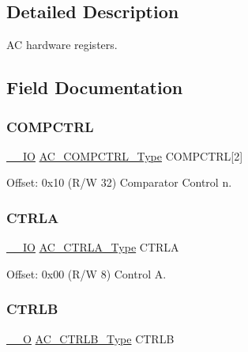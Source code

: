 \subsection{Detailed Description}
AC hardware registers. 

\subsection{Field Documentation}
\mbox{\label{struct_ac_a03a1ac0b5cd22c33531cdb31674b7eb2}} 
\subsubsection{\texorpdfstring{COMPCTRL}{COMPCTRL}}
{\footnotesize\ttfamily \mbox{\hyperlink{core__cm0plus_8h_aec43007d9998a0a0e01faede4133d6be}{\+\_\+\+\_\+\+IO}} \mbox{\hyperlink{union_a_c___c_o_m_p_c_t_r_l___type}{A\+C\+\_\+\+C\+O\+M\+P\+C\+T\+R\+L\+\_\+\+Type}} C\+O\+M\+P\+C\+T\+RL\mbox{[}2\mbox{]}}



Offset\+: 0x10 (R/W 32) Comparator Control n. 

\mbox{\label{struct_ac_a3209b7b8f542b802bd759d39be69aed8}} 
\subsubsection{\texorpdfstring{CTRLA}{CTRLA}}
{\footnotesize\ttfamily \mbox{\hyperlink{core__cm0plus_8h_aec43007d9998a0a0e01faede4133d6be}{\+\_\+\+\_\+\+IO}} \mbox{\hyperlink{union_a_c___c_t_r_l_a___type}{A\+C\+\_\+\+C\+T\+R\+L\+A\+\_\+\+Type}} C\+T\+R\+LA}



Offset\+: 0x00 (R/W 8) Control A. 

\mbox{\label{struct_ac_a05e0ac5f8548b79a95ad9a3f2bbc5641}} 
\subsubsection{\texorpdfstring{CTRLB}{CTRLB}}
{\footnotesize\ttfamily \mbox{\hyperlink{core__cm0plus_8h_a7e25d9380f9ef903923964322e71f2f6}{\+\_\+\+\_\+O}} \mbox{\hyperlink{union_a_c___c_t_r_l_b___type}{A\+C\+\_\+\+C\+T\+R\+L\+B\+\_\+\+Type}} C\+T\+R\+LB}



